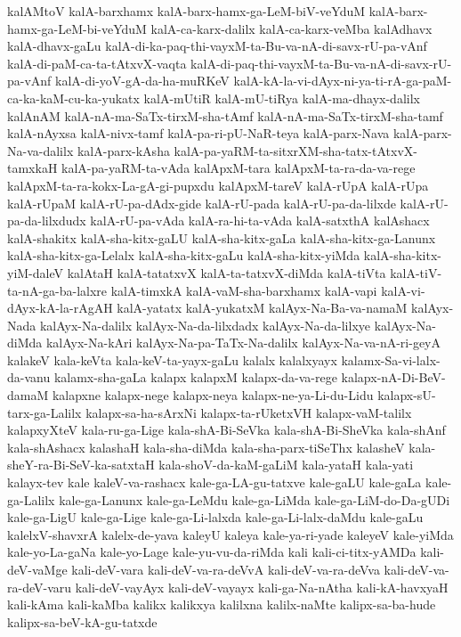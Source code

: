 {kalAMtoV
kalA-barxhamx
kalA-barx-hamx-ga-LeM-biV-veYduM
kalA-barx-hamx-ga-LeM-bi-veYduM
kalA-ca-karx-dalilx
kalA-ca-karx-veMba
kalAdhavx
kalA-dhavx-gaLu
kalA-di-ka-paq-thi-vayxM-ta-Bu-va-nA-di-savx-rU-pa-vAnf
kalA-di-paM-ca-ta-tAtxvX-vaqta
kalA-di-paq-thi-vayxM-ta-Bu-va-nA-di-savx-rU-pa-vAnf
kalA-di-yoV-gA-da-ha-muRKeV
kalA-kA-la-vi-dAyx-ni-ya-ti-rA-ga-paM-ca-ka-kaM-cu-ka-yukatx
kalA-mUtiR
kalA-mU-tiRya
kalA-ma-dhayx-dalilx
kalAnAM
kalA-nA-ma-SaTx-tirxM-sha-tAmf
kalA-nA-ma-SaTx-tirxM-sha-tamf
kalA-nAyxsa
kalA-nivx-tamf
kalA-pa-ri-pU-NaR-teya
kalA-parx-Nava
kalA-parx-Na-va-dalilx
kalA-parx-kAsha
kalA-pa-yaRM-ta-sitxrXM-sha-tatx-tAtxvX-tamxkaH
kalA-pa-yaRM-ta-vAda
kalApxM-tara
kalApxM-ta-ra-da-va-rege
kalApxM-ta-ra-kokx-La-gA-gi-pupxdu
kalApxM-tareV
kalA-rUpA
kalA-rUpa
kalA-rUpaM
kalA-rU-pa-dAdx-gide
kalA-rU-pada
kalA-rU-pa-da-lilxde
kalA-rU-pa-da-lilxdudx
kalA-rU-pa-vAda
kalA-ra-hi-ta-vAda
kalA-satxthA
kalAshacx
kalA-shakitx
kalA-sha-kitx-gaLU
kalA-sha-kitx-gaLa
kalA-sha-kitx-ga-Lanunx
kalA-sha-kitx-ga-Lelalx
kalA-sha-kitx-gaLu
kalA-sha-kitx-yiMda
kalA-sha-kitx-yiM-daleV
kalAtaH
kalA-tatatxvX
kalA-ta-tatxvX-diMda
kalA-tiVta
kalA-tiV-ta-nA-ga-ba-lalxre
kalA-timxkA
kalA-vaM-sha-barxhamx
kalA-vapi
kalA-vi-dAyx-kA-la-rAgAH
kalA-yatatx
kalA-yukatxM
kalAyx-Na-Ba-va-namaM
kalAyx-Nada
kalAyx-Na-dalilx
kalAyx-Na-da-lilxdadx
kalAyx-Na-da-lilxye
kalAyx-Na-diMda
kalAyx-Na-kAri
kalAyx-Na-pa-TaTx-Na-dalilx
kalAyx-Na-va-nA-ri-geyA
kalakeV
kala-keVta
kala-keV-ta-yayx-gaLu
kalalx
kalalxyayx
kalamx-Sa-vi-lalx-da-vanu
kalamx-sha-gaLa
kalapx
kalapxM
kalapx-da-va-rege
kalapx-nA-Di-BeV-damaM
kalapxne
kalapx-nege
kalapx-neya
kalapx-ne-ya-Li-du-Lidu
kalapx-sU-tarx-ga-Lalilx
kalapx-sa-ha-sArxNi
kalapx-ta-rUketxVH
kalapx-vaM-talilx
kalapxyXteV
kala-ru-ga-Lige
kala-shA-Bi-SeVka
kala-shA-Bi-SheVka
kala-shAnf
kala-shAshacx
kalashaH
kala-sha-diMda
kala-sha-parx-tiSeThx
kalasheV
kala-sheY-ra-Bi-SeV-ka-satxtaH
kala-shoV-da-kaM-gaLiM
kala-yataH
kala-yati
kalayx-tev
kale
kaleV-va-rashacx
kale-ga-LA-gu-tatxve
kale-gaLU
kale-gaLa
kale-ga-Lalilx
kale-ga-Lanunx
kale-ga-LeMdu
kale-ga-LiMda
kale-ga-LiM-do-Da-gUDi
kale-ga-LigU
kale-ga-Lige
kale-ga-Li-lalxda
kale-ga-Li-lalx-daMdu
kale-gaLu
kalelxV-shavxrA
kalelx-de-yava
kaleyU
kaleya
kale-ya-ri-yade
kaleyeV
kale-yiMda
kale-yo-La-gaNa
kale-yo-Lage
kale-yu-vu-da-riMda
kali
kali-ci-titx-yAMDa
kali-deV-vaMge
kali-deV-vara
kali-deV-va-ra-deVvA
kali-deV-va-ra-deVva
kali-deV-va-ra-deV-varu
kali-deV-vayAyx
kali-deV-vayayx
kali-ga-Na-nAtha
kali-kA-havxyaH
kali-kAma
kali-kaMba
kalikx
kalikxya
kalilxna
kalilx-naMte
kalipx-sa-ba-hude
kalipx-sa-beV-kA-gu-tatxde
}
